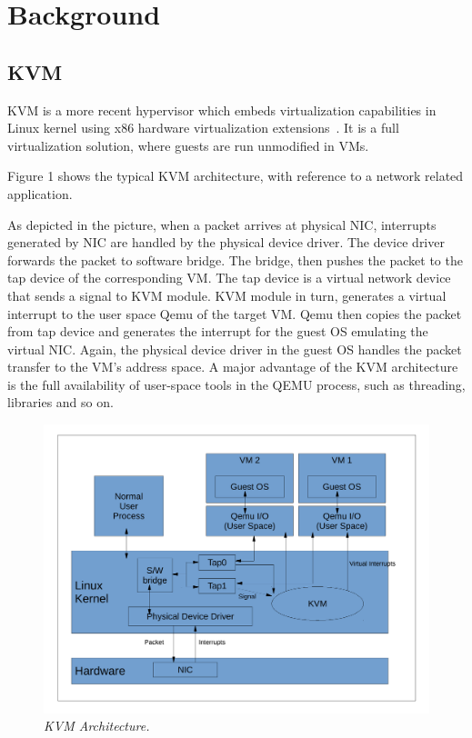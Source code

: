 \section{Background} \label{sec:background}

\subsection{KVM} \label{sec:kvm}

KVM is a more recent hypervisor which embeds virtualization capabilities 
in Linux kernel using x86 hardware virtualization extensions~\cite{kivity2007kvm}. 
It is a full virtualization solution, where guests are run unmodified in VMs. 

Figure 1 shows the typical KVM architecture, with reference to a network related
application. 

As depicted in the picture, when a packet arrives at physical NIC,
interrupts generated by NIC are handled by the physical device driver. The device
driver forwards the packet to software bridge. The bridge, then pushes the packet
to the tap device of the corresponding VM. The tap device is a virtual network
device that sends a signal to KVM module. KVM module in turn, generates a virtual
interrupt to the user space Qemu of the target VM. Qemu then copies the packet from
tap device and generates the interrupt for the guest OS emulating the virtual NIC.
Again, the physical device driver in the guest OS handles the packet transfer to
the VM’s address space. A major advantage of the KVM architecture is the full
availability of user-space tools in the QEMU process, such as threading, libraries
and so on.

\begin{figure}[t]
\centering
\includegraphics[width=.47\textwidth]{figures/kvm}
\vspace{-.2in}
\caption{{\em KVM Architecture.}} \label{fig:kvm}
\vspace{.05in}
\end{figure}

